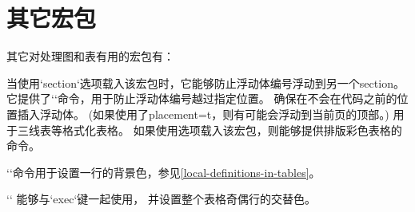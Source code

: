 
\section{其它宏包}
\label{other-packages}

其它对处理图和表有用的宏包有：

  当使用`section`选项载入该宏包时，它能够防止浮动体编号浮动到另一个section。
  它提供了`\FloatBarrier`命令，用于防止浮动体编号越过指定位置。
  确保在不会在代码之前的位置插入浮动体。
  (如果使用了placement=t，则有可能会浮动到当前页的顶部。)
  用于三线表等格式化表格。
  如果使用选项载入该宏包，则能够提供排版彩色表格的命令。

  ``命令用于设置一行的背景色，参见\cref{local-definitions-in-tables}。

  `` 能够与`exec`键一起使用，
  并设置整个表格奇偶行的交替色。

